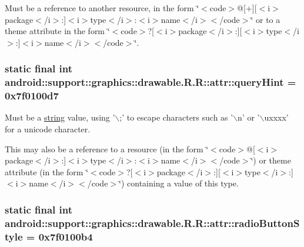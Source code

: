 Must be a reference to another resource, in the form \char`\"{}$<$code$>$@\mbox{[}+\mbox{]}\mbox{[}$<$i$>$package$<$/i$>$:\mbox{]}$<$i$>$type$<$/i$>$:$<$i$>$name$<$/i$>$$<$/code$>$\char`\"{} or to a theme attribute in the form \char`\"{}$<$code$>$?\mbox{[}$<$i$>$package$<$/i$>$:\mbox{]}\mbox{[}$<$i$>$type$<$/i$>$:\mbox{]}$<$i$>$name$<$/i$>$$<$/code$>$\char`\"{}. \hypertarget{classandroid_1_1support_1_1graphics_1_1drawable_1_1_r_1_1attr_fb12744f28a16232970346c7352c8e13}{
\subsubsection[{queryHint}]{\setlength{\rightskip}{0pt plus 5cm}static final int android::support::graphics::drawable.R.R::attr::queryHint = 0x7f0100d7}}
\label{classandroid_1_1support_1_1graphics_1_1drawable_1_1_r_1_1attr_fb12744f28a16232970346c7352c8e13}


Must be a \hyperlink{classandroid_1_1support_1_1graphics_1_1drawable_1_1_r_1_1string}{string} value, using '$\backslash$;' to escape characters such as '$\backslash$n' or '$\backslash$uxxxx' for a unicode character. 

This may also be a reference to a resource (in the form \char`\"{}$<$code$>$@\mbox{[}$<$i$>$package$<$/i$>$:\mbox{]}$<$i$>$type$<$/i$>$:$<$i$>$name$<$/i$>$$<$/code$>$\char`\"{}) or theme attribute (in the form \char`\"{}$<$code$>$?\mbox{[}$<$i$>$package$<$/i$>$:\mbox{]}\mbox{[}$<$i$>$type$<$/i$>$:\mbox{]}$<$i$>$name$<$/i$>$$<$/code$>$\char`\"{}) containing a value of this type. \hypertarget{classandroid_1_1support_1_1graphics_1_1drawable_1_1_r_1_1attr_8de71e6cbf9eacd80ef96c4672179564}{
\subsubsection[{radioButtonStyle}]{\setlength{\rightskip}{0pt plus 5cm}static final int android::support::graphics::drawable.R.R::attr::radioButtonStyle = 0x7f0100b4}}
\label{classandroid_1_1support_1_1graphics_1_1drawable_1_1_r_1_1attr_8de71e6cbf9eacd80ef96c4672179564}


